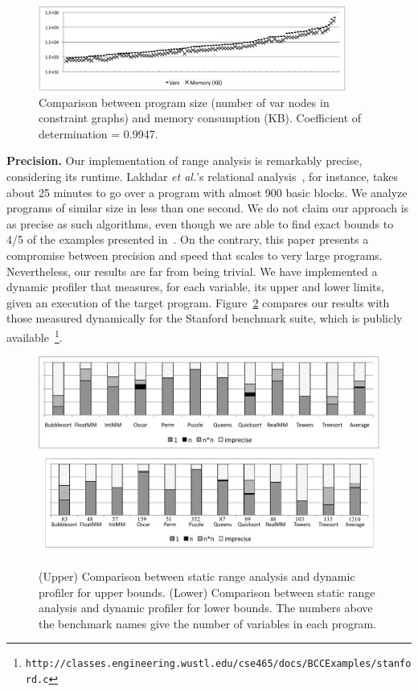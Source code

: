 \documentclass[times]{speauth}
\begin{document}
\begin{figure}[t!]
\begin{center}
\includegraphics[width=0.9\textwidth]{images/MemCorr}
\end{center}
\caption{\label{fig:MemCorr}
Comparison between program size (number of var nodes in constraint
graphs) and memory consumption (KB).
Coefficient of determination = 0.9947.
}
\end{figure}

\noindent
\textbf{Precision.}
Our implementation of range analysis is remarkably precise, considering its
runtime.
Lakhdar {\em et al.}'s relational analysis~\cite{Lakhdar11}, for instance, takes
about 25 minutes to go over a program with almost 900 basic blocks.
We analyze programs of similar size in less than one second.
We do not claim our approach is as precise as such algorithms, even though we
are able to find exact bounds to 4/5 of the examples presented
in~\cite{Lakhdar11}.
On the contrary, this paper presents a compromise between precision and speed
that scales to very large programs.
Nevertheless, our results are far from being trivial.
We have implemented a dynamic profiler that measures, for each variable,
its upper and lower limits, given an execution of the target program.
Figure~\ref{fig:precision} compares our results with those measured
dynamically for the Stanford benchmark suite, which is publicly
available~\footnote{\texttt{http://classes.engineering.wustl.edu/cse465/docs/BCCExamples/stanford.c}}.

\begin{figure}[t!]
\begin{center}
\includegraphics[width=\textwidth]{images/precUpperBound}
\includegraphics[width=\textwidth]{images/precLowerBound}
\end{center}
\caption{\label{fig:precision}
(Upper) Comparison between static range analysis and dynamic profiler for
upper bounds.
(Lower) Comparison between static range analysis and dynamic profiler for
lower bounds. The numbers above the benchmark names give the number of
variables in each program.}
\end{figure}
\end{document}
